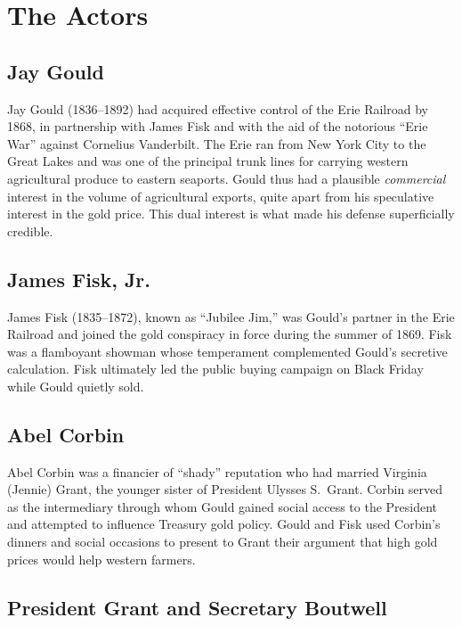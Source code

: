 \documentclass[12pt]{article}
\begin{document}
\section{The Actors}

\subsection{Jay Gould}

Jay Gould (1836--1892) had acquired effective control of the Erie Railroad 
by 1868, in partnership with James Fisk and with the aid of the notorious 
``Erie War'' against Cornelius Vanderbilt. The Erie ran from New York City 
to the Great Lakes and was one of the principal trunk lines for carrying 
western agricultural produce to eastern seaports. Gould thus had a 
plausible \emph{commercial} interest in the volume of agricultural 
exports, quite apart from his speculative interest in the gold price. This 
dual interest is what made his defense superficially credible.

\subsection{James Fisk, Jr.}

James Fisk (1835--1872), known as ``Jubilee Jim,'' was Gould's partner in 
the Erie Railroad and joined the gold conspiracy in force during the 
summer of 1869. Fisk was a flamboyant showman whose temperament 
complemented Gould's secretive calculation. Fisk ultimately led the 
public buying campaign on Black Friday while Gould quietly sold.

\subsection{Abel Corbin}

Abel Corbin was a financier of ``shady'' reputation who had married 
Virginia (Jennie) Grant, the younger sister of President Ulysses S.\ 
Grant. Corbin served as the intermediary through whom Gould gained social 
access to the President and attempted to influence Treasury gold policy. 
Gould and Fisk used Corbin's dinners and social occasions to present to 
Grant their argument that high gold prices would help western farmers.

\subsection{President Grant and Secretary Boutwell}
\end{document}
